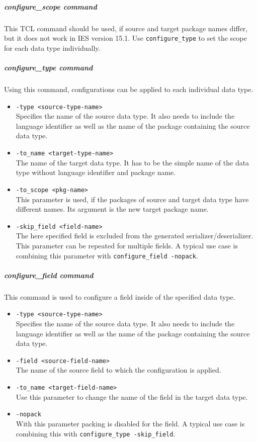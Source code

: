 \subparagraph{configure\_scope command}
This TCL command should be used, if source and target package names differ, but it does not work in IES version 15.1. Use \lstinline$configure_type$ to set the scope for each data type individually.
\subparagraph{configure\_type command}
Using this command, configurations can be applied to each individual data type.

\begin{itemize}
  \item{\lstinline$-type <source-type-name>$}\\
  Specifies the name of the source data type. It also needs to include the language identifier as well as the name of the package containing the source data type.
  \item{\lstinline$-to_name <target-type-name>$}\\
  The name of the target data type. It has to be the simple name of the data type without language identifier and package name.
  \item{\lstinline$-to_scope <pkg-name>$}\\
  This parameter is used, if the packages of source and target data type have different names. Its argument is the new target package name.
  \item{\lstinline$-skip_field <field-name>$}\\
  The here specified field is excluded from the generated serializer/deserializer. This parameter can be repeated for multiple fields. A typical use case is combining this parameter with \lstinline$configure_field -nopack$.
\end{itemize}
\subparagraph{configure\_field command}
This command is used to configure a field inside of the specified data type.
\begin{itemize}
  \item{\lstinline$-type <source-type-name>$}\\
  Specifies the name of the source data type. It also needs to include the language identifier as well as the name of the package containing the source data type.
  \item{\lstinline$-field <source-field-name>$}\\
  The name of the source field to which the configuration is applied.
  \item{\lstinline$-to_name <target-field-name>$}\\
  Use this parameter to change the name of the field in the target data type.
  \item{\lstinline$-nopack$}\\
  With this parameter packing is disabled for the field. A typical use case is combining this with \lstinline$configure_type -skip_field$.
\end{itemize}


